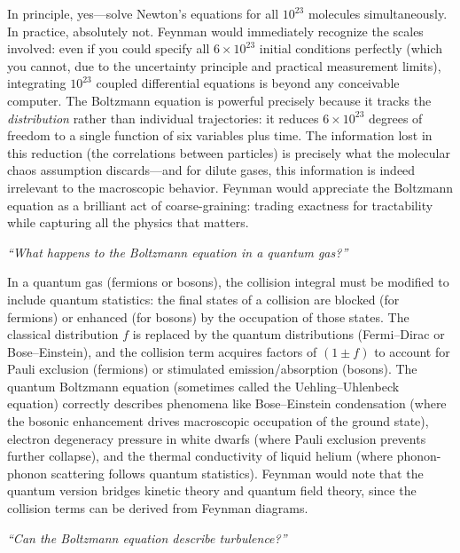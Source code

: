 \documentclass[11pt,openright]{book}
\begin{document}
In principle, yes---solve Newton's equations for all $10^{23}$ molecules simultaneously. In practice, absolutely not. Feynman would immediately recognize the scales involved: even if you could specify all $6\times 10^{23}$ initial conditions perfectly (which you cannot, due to the uncertainty principle and practical measurement limits), integrating $10^{23}$ coupled differential equations is beyond any conceivable computer. The Boltzmann equation is powerful precisely because it tracks the \emph{distribution} rather than individual trajectories: it reduces $6\times 10^{23}$ degrees of freedom to a single function of six variables plus time. The information lost in this reduction (the correlations between particles) is precisely what the molecular chaos assumption discards---and for dilute gases, this information is indeed irrelevant to the macroscopic behavior. Feynman would appreciate the Boltzmann equation as a brilliant act of coarse-graining: trading exactness for tractability while capturing all the physics that matters.

\textit{``What happens to the Boltzmann equation in a quantum gas?''}

In a quantum gas (fermions or bosons), the collision integral must be modified to include quantum statistics: the final states of a collision are blocked (for fermions) or enhanced (for bosons) by the occupation of those states. The classical distribution $f$ is replaced by the quantum distributions (Fermi--Dirac or Bose--Einstein), and the collision term acquires factors of $(1 \pm f)$ to account for Pauli exclusion (fermions) or stimulated emission/absorption (bosons). The quantum Boltzmann equation (sometimes called the Uehling--Uhlenbeck equation) correctly describes phenomena like Bose--Einstein condensation (where the bosonic enhancement drives macroscopic occupation of the ground state), electron degeneracy pressure in white dwarfs (where Pauli exclusion prevents further collapse), and the thermal conductivity of liquid helium (where phonon-phonon scattering follows quantum statistics). Feynman would note that the quantum version bridges kinetic theory and quantum field theory, since the collision terms can be derived from Feynman diagrams.

\textit{``Can the Boltzmann equation describe turbulence?''}
\end{document}
